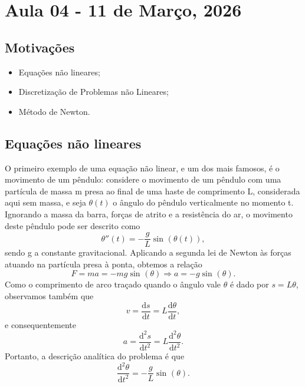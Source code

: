 \documentclass[../differential_methods.tex]{subfiles}
\begin{document}
\section{Aula 04 - 11 de Março, 2026}
\subsection{Motivações}
\begin{itemize}
	\item Equações não lineares;
	\item Discretização de Problemas não Lineares;
	\item Método de Newton.
\end{itemize}
\subsection{Equações não lineares}
O primeiro exemplo de uma equação não linear, e um dos mais famosos, é o movimento de um pêndulo: considere o movimento de um pêndulo com uma partícula de massa m presa ao final de uma haste de comprimento L, considerada aqui sem massa, e seja \(\theta (t)\) o ângulo do pêndulo verticalmente no momento t.
Ignorando a massa da barra, forças de atrito e a resistência do ar, o movimento deste pêndulo pode ser descrito como
\[
	\theta ''(t)=-\frac{g}{L}\sin^{}{(\theta (t))},
\]
sendo g a constante gravitacional. Aplicando a segunda lei de Newton às forças atuando na partícula presa à ponta, obtemos a relação
\[
	F = m a = -mg\sin^{}{(\theta )} \Rightarrow a = -g \sin^{}{(\theta )}.
\]
Como o comprimento de arco traçado quando o ângulo vale \(\theta \) é dado por \(s = L \theta \), observamos também que
\[
	v = \frac{\mathrm{d}s}{\mathrm{d}t} = L \frac{\mathrm{d}\theta }{\mathrm{d}t},
\]
e consequentemente
\[
	a = \frac{\mathrm{d}^{2}s}{\mathrm{d}t^{2}} = L \frac{\mathrm{d}^{2}\theta }{\mathrm{d}t^{2}}.
\]
Portanto, a descrição analítica do problema é que
\[
	\frac{\mathrm{d}^{2}\theta }{\mathrm{d}t^{2}}=-\frac{g}{L}\sin^{}{(\theta )}.
\]
\end{document}
